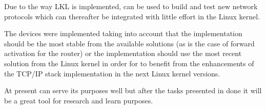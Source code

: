 Due to the way LKL is implemented, \project can be used to build and test new network protocols which can thereafter be integrated with little effort in the Linux kernel.

The \project devices were implemented taking into account that the implementation should be the most stable from the available solutions (as is the case of forward activation for the router) or the implementation should use the most recent solution from the Linux kernel in order for \project to benefit from the enhancements of the TCP/IP stack implementation in the next Linux kernel versions.

At present \project can serve its purposes well but after the tasks presented in  done it will be a great tool for research and learn purposes. 
